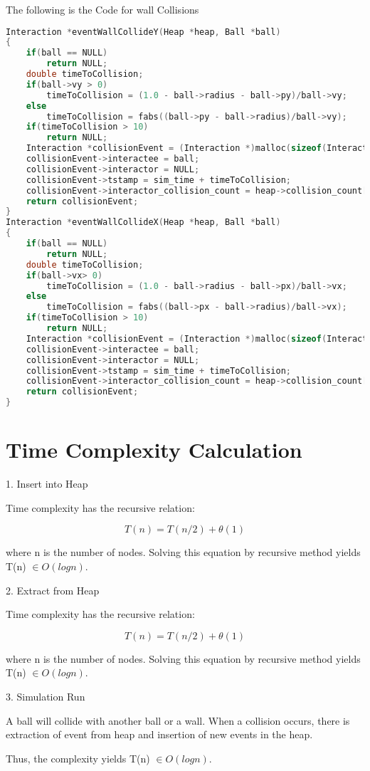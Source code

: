 \documentclass{article}
\begin{document}
The following is the Code for wall Collisions
\begin{lstlisting}[language=c, caption=process schedule]
Interaction *eventWallCollideY(Heap *heap, Ball *ball)
{
    if(ball == NULL)
        return NULL;
    double timeToCollision;
    if(ball->vy > 0)
        timeToCollision = (1.0 - ball->radius - ball->py)/ball->vy;
    else
        timeToCollision = fabs((ball->py - ball->radius)/ball->vy);
    if(timeToCollision > 10)
        return NULL;
    Interaction *collisionEvent = (Interaction *)malloc(sizeof(Interaction));
    collisionEvent->interactee = ball;
    collisionEvent->interactor = NULL;
    collisionEvent->tstamp = sim_time + timeToCollision;
    collisionEvent->interactor_collision_count = heap->collision_count[ball->id];
    return collisionEvent;
}
Interaction *eventWallCollideX(Heap *heap, Ball *ball)
{
    if(ball == NULL)
        return NULL;
    double timeToCollision;
    if(ball->vx> 0)
        timeToCollision = (1.0 - ball->radius - ball->px)/ball->vx;
    else
        timeToCollision = fabs((ball->px - ball->radius)/ball->vx);
    if(timeToCollision > 10)
        return NULL;
    Interaction *collisionEvent = (Interaction *)malloc(sizeof(Interaction));
    collisionEvent->interactee = ball;
    collisionEvent->interactor = NULL;
    collisionEvent->tstamp = sim_time + timeToCollision;
    collisionEvent->interactor_collision_count = heap->collision_count[ball->id];
    return collisionEvent;
}
\end{lstlisting}

\section{Time Complexity Calculation}

1. Insert into Heap

Time complexity has the recursive relation:

\[ T(n) = T(n/2) + \theta(1) \]

where n is the number of nodes.
Solving this equation by recursive method yields T(n) $\in O(log n)$.

2. Extract from Heap

Time complexity has the recursive relation:

\[ T(n) = T(n/2) + \theta(1) \]

where n is the number of nodes.
Solving this equation by recursive method yields T(n) $\in O(log n)$.

3. Simulation Run

A ball will collide with another ball or a wall. When a collision occurs, there is extraction of event from heap and insertion of new events in the heap.

Thus, the complexity yields T(n) $\in O(log n)$.
\end{document}
